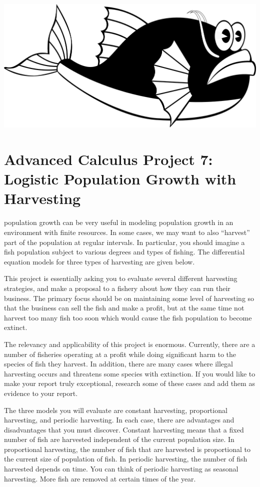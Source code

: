 \documentclass
[justified,nohyper]
{tufte-handout}
\begin{document}
\includegraphics[scale=0.3]{fish.png}
\section{Advanced Calculus Project 7: Logistic Population Growth with Harvesting}

 population growth can be very useful in modeling population
growth in 
an environment with finite resources. In some cases, we may want to also ``harvest'' part of the 
population at regular intervals. In particular, you should imagine a fish population subject to 
various degrees and types of fishing. The differential equation models for three types of
harvesting are given below.

This project is essentially asking you to evaluate several different harvesting strategies, and
make a proposal to a fishery about how they can run their business. The primary focus should be
on maintaining some level of harvesting so that the business can sell the fish and make a profit,
but at the same time not harvest too many fish too soon which would cause the fish population
to become extinct.

The relevancy and applicability of this project is enormous. Currently, there are a number
of fisheries operating at a profit while doing significant harm to the species of fish they
harvest. In addition, there are many cases where illegal harvesting occurs and threatens some
species with extinction. If you would like to make your report truly exceptional, research some
of these cases and add them as evidence to your report.

The three models you will evaluate are constant harvesting, proportional harvesting, and periodic
harvesting. In each case, there are advantages and disadvantages that you must discover. Constant
harvesting means that a fixed number of fish are harvested independent of the current population
size.
In proportional harvesting, the number of fish that are harvested is proportional to the current
size of population of fish. In periodic harvesting, the number of fish harvested depends on time.
You
can think of periodic harvesting as seasonal harvesting. More fish are removed at certain times
of the year.
\end{document}
